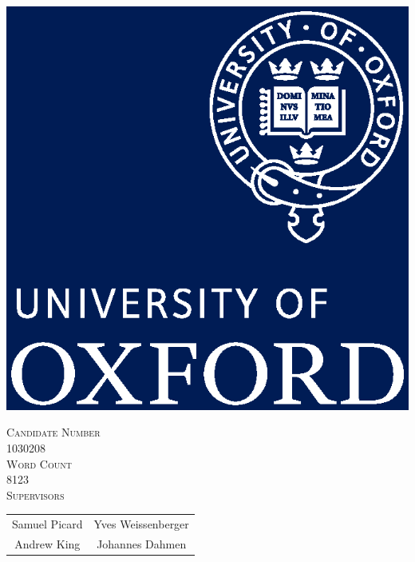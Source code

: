 \begin{titlepage}
\includegraphics[height=0.2\textheight]{figs/ox_sigil.eps}\\[1cm] %




\vfill


\begin{Large}
\textsc{Candidate Number}\\1030208\\[1cm]
\textsc{Word Count}\\8123\\[1cm]
\textsc{Supervisors}\\
\begin{tabular}{cc}
Samuel Picard&
Yves Weissenberger\\
Andrew King&
Johannes Dahmen
\end{tabular}
\end{Large}

\vfill

\end{titlepage}

\setcounter{page}{2}